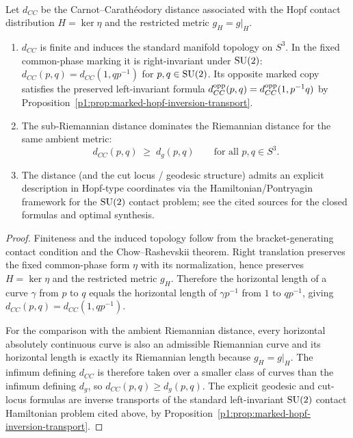 \documentclass[11pt]{article}
\begin{document}
\begin{theorem}
\label{p1:thm:marked-cc-distance}
\mbox{}\\[6pt] 
Let $d_{CC}$ be the Carnot--Carath\'eodory distance associated with the Hopf contact distribution
$H=\ker\eta$ and the restricted metric $g_H=g|_H$.
\begin{enumerate}
\item $d_{CC}$ is finite and induces the standard manifold topology on $S^3$.
In the fixed common-phase marking it is right-invariant under $\mathrm{SU}(2)$:
$d_{CC}(p,q)=d_{CC}(1,qp^{-1})$ for $p,q\in\mathrm{SU}(2)$.
Its opposite marked copy satisfies the preserved left-invariant formula
$d_{CC}^{\rm opp}(p,q)=d_{CC}^{\rm opp}(1,p^{-1}q)$ by
Proposition~\ref{p1:prop:marked-hopf-inversion-transport}.
\item The sub-Riemannian distance dominates the Riemannian distance for the same ambient metric:
\[
d_{CC}(p,q)\;\ge\; d_g(p,q)\qquad\text{for all }p,q\in S^3.
\]
\item The distance (and the cut locus / geodesic structure) admits an explicit description in Hopf-type coordinates
via the Hamiltonian/Pontryagin framework for the $\mathrm{SU}(2)$ contact problem; see the cited sources for the closed
formulas and optimal synthesis.
\end{enumerate}
\cite{boscainrossi2008cc,montgomery2002tour,agrachev2019comprehensive}
\end{theorem}

\begin{proof}
Finiteness and the induced topology follow from the bracket-generating contact condition and the
Chow--Rashevskii theorem.  Right translation preserves the fixed
common-phase form \(\eta\) with its normalization, hence preserves
\(H=\ker\eta\) and the restricted metric \(g_H\).  Therefore the horizontal length of a curve \(\gamma\)
from \(p\) to \(q\) equals the horizontal length of \(\gamma p^{-1}\)
from \(1\) to \(qp^{-1}\), giving
\(d_{CC}(p,q)=d_{CC}(1,qp^{-1})\).

For the comparison with the ambient Riemannian distance, every horizontal absolutely continuous curve
is also an admissible Riemannian curve and its horizontal length is exactly its Riemannian length because
\(g_H=g|_H\).  The infimum defining \(d_{CC}\) is therefore taken over a smaller class of curves than the
infimum defining \(d_g\), so \(d_{CC}(p,q)\ge d_g(p,q)\).  The explicit geodesic and cut-locus formulas
are inverse transports of the standard left-invariant \(\mathrm{SU}(2)\)
contact Hamiltonian problem cited above, by
Proposition~\ref{p1:prop:marked-hopf-inversion-transport}.
\end{proof}
\end{document}
